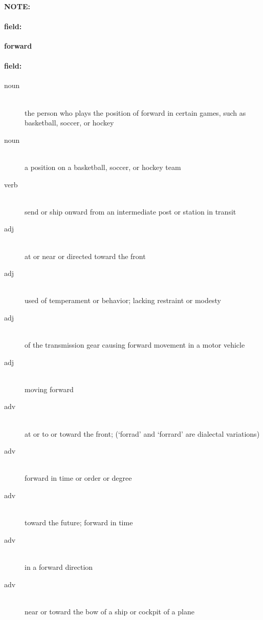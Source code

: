 \documentclass[12pt]{article}
\newenvironment{note}{\paragraph{NOTE:}}{}
\newenvironment{field}{\paragraph{field:}}{}
\begin{document}
\begin{note}
\begin{field}
\textbf{\large forward}
\end{field}


\begin{field}
\begin{description}
\item[noun] \hfill \\ 
the person who plays the position of forward in certain games, such as basketball, soccer, or hockey

\item[noun] \hfill \\ 
a position on a basketball, soccer, or hockey team

\item[verb] \hfill \\ 
send or ship onward from an intermediate post or station in transit

\item[adj] \hfill \\ 
at or near or directed toward the front

\item[adj] \hfill \\ 
used of temperament or behavior; lacking restraint or modesty

\item[adj] \hfill \\ 
of the transmission gear causing forward movement in a motor vehicle

\item[adj] \hfill \\ 
moving forward

\item[adv] \hfill \\ 
at or to or toward the front; (`forrad' and `forrard' are dialectal variations)

\item[adv] \hfill \\ 
forward in time or order or degree

\item[adv] \hfill \\ 
toward the future; forward in time

\item[adv] \hfill \\ 
in a forward direction

\item[adv] \hfill \\ 
near or toward the bow of a ship or cockpit of a plane


\end{description}
\end{field}
\end{note}
\end{document}
